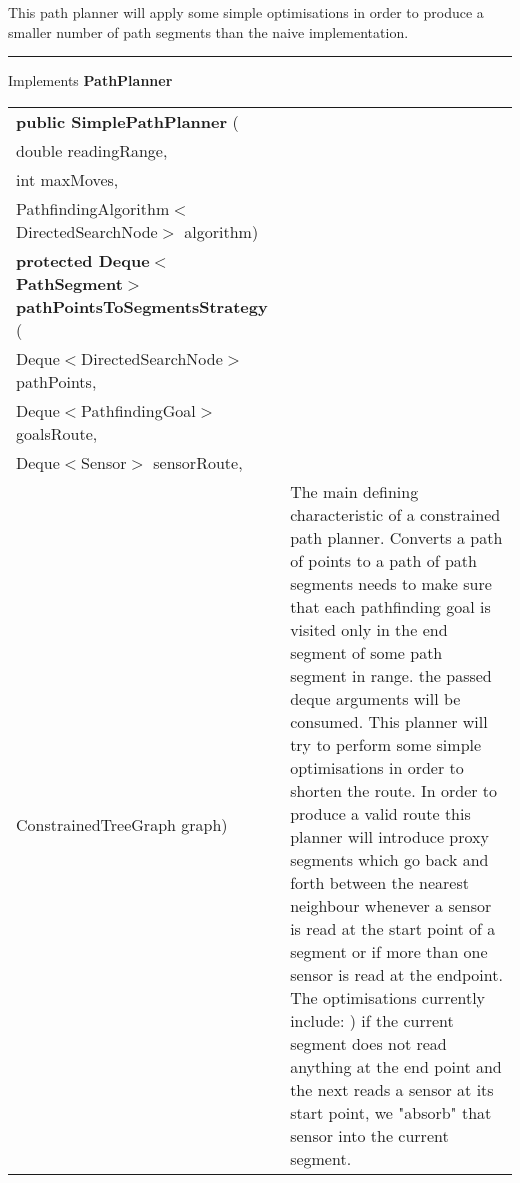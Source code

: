  { This path planner will apply some simple optimisations in order to produce a smaller number of path segments than the naive implementation.
 
\vspace*{4pt} \hrule \vspace*{3pt}
Implements \textbf{ PathPlanner }
\begin{tabular}{ p{3in}|m{3.4in}}
\textbf{public SimplePathPlanner } (\\ \hspace*{ 5pt} double readingRange,\\\hspace*{ 5pt} int maxMoves,\\\hspace*{ 5pt} PathfindingAlgorithm$<$DirectedSearchNode$>$ algorithm) & \\ \hline 
\textbf{protected Deque$<$PathSegment$>$ pathPointsToSegmentsStrategy } (\\ \hspace*{ 5pt} Deque$<$DirectedSearchNode$>$ pathPoints,\\\hspace*{ 5pt} Deque$<$PathfindingGoal$>$ goalsRoute,\\\hspace*{ 5pt} Deque$<$Sensor$>$ sensorRoute,\\\hspace*{ 5pt} ConstrainedTreeGraph graph) & The main defining characteristic of a constrained path planner. Converts a path of points to a path of path segments\newline%
 needs to make sure that each pathfinding goal is visited only in the end segment of some path segment in range.\newline%
 the passed deque arguments will be consumed. This planner will try to perform some simple optimisations in order to shorten the route.\newline%
 In order to produce a valid route this planner will introduce proxy segments which go back and forth between the nearest neighbour\newline%
 whenever a sensor is read at the start point of a segment or if more than one sensor is read at the endpoint. The optimisations currently include:\newline%
  \newline%
 1) if the current segment does not read anything at the end point and the next reads a sensor at its start point, we "absorb" that sensor into\newline%
 the current segment.\\ \hline 
\end{tabular}
}
